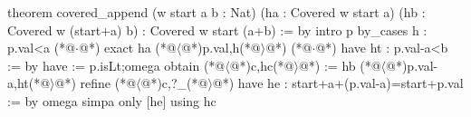 theorem covered_append (w start a b : Nat)
    (ha : Covered w start a) (hb : Covered w (start+a) b) : Covered w start (a+b) := by
  intro p
  by_cases h : p.val<a
  (*@$\cdot$@*) exact ha (*@$\langle$@*)p.val,h(*@$\rangle$@*)
  (*@$\cdot$@*) have ht : p.val-a<b := by have := p.isLt;omega
    obtain (*@$\langle$@*)c,hc(*@$\rangle$@*) := hb (*@$\langle$@*)p.val-a,ht(*@$\rangle$@*)
    refine (*@$\langle$@*)c,?_(*@$\rangle$@*)
    have he : start+a+(p.val-a)=start+p.val := by omega
    simpa only [he] using hc
